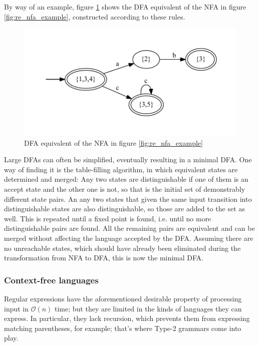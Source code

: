 			By way of an example, figure \ref{fig:re_dfa_example} shows the DFA equivalent of the NFA in figure \ref{fig:re_nfa_example}, constructed according to these rules.
			
			\begin{figure}
			\centering
			\includegraphics[width=\textwidth]{figures/re_example_dfa}
			\caption{DFA equivalent of the NFA in figure \ref{fig:re_nfa_example}}
			\label{fig:re_dfa_example}
			\end{figure}
			
			Large DFAs can often be simplified, eventually resulting in a minimal DFA. One way of finding it is the table-filling algorithm, in which equivalent states are determined and merged: Any two states are distinguishable if one of them is an accept state and the other one is not, so that is the initial set of demonstrably different state pairs. An any two states that given the same input transition into distinguishable states are also distinguishable, so those are added to the set as well. This is repeated until a fixed point is found, i.e. until no more distinguishable pairs are found. All the remaining pairs are equivalent and can be merged without affecting the language accepted by the DFA. Assuming there are no unreachable states, which should have already been eliminated during the transformation from NFA to DFA, this is now the minimal DFA.
			
			
			\subsubsection{Context-free languages}
			
			Regular expressions have the aforementioned desirable property of processing input in $\mathcal{O}(n)$ time; but they are limited in the kinds of languages they can express. In particular, they lack recursion, which prevents them from expressing matching parentheses, for example; that's where Type-2 grammars come into play.
			

